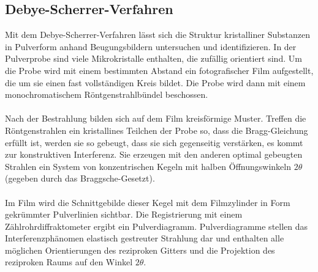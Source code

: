\documentclass[a4paper,titlepage]{scrartcl}
\numberwithin{equation}{section}
\begin{document}
\subsection{Debye-Scherrer-Verfahren}
Mit dem Debye-Scherrer-Verfahren lässt sich die Struktur kristalliner Substanzen in Pulverform anhand Beugungsbildern untersuchen und identifizieren. In der Pulverprobe sind viele Mikrokristalle enthalten, die zufällig orientiert sind. Um die Probe wird mit einem bestimmten Abstand ein fotografischer Film aufgestellt, die um sie einen fast vollständigen Kreis bildet. Die Probe wird dann mit einem monochromatischem Röntgenstrahlbündel beschossen.\\ \\
Nach der Bestrahlung bilden sich auf dem Film kreisförmige Muster. Treffen die Röntgenstrahlen ein kristallines Teilchen der Probe so, dass die Bragg-Gleichung erfüllt ist, werden sie so gebeugt, dass sie sich gegenseitig verstärken, es kommt zur konstruktiven Interferenz. Sie erzeugen mit den anderen optimal gebeugten Strahlen ein System von konzentrischen Kegeln mit halben Öffnungswinkeln $2 \theta$ (gegeben durch das Braggsche-Gesetzt).\\ \\
Im Film wird die Schnittgebilde dieser Kegel mit dem Filmzylinder in Form gekrümmter Pulverlinien sichtbar. Die Registrierung mit einem Zählrohrdiffraktometer ergibt ein Pulverdiagramm. Pulverdiagramme stellen das Interferenzphänomen elastisch gestreuter Strahlung dar und enthalten alle möglichen Orientierungen des reziproken Gitters und die Projektion des reziproken Raums auf den Winkel $2 \theta$.
\end{document}
